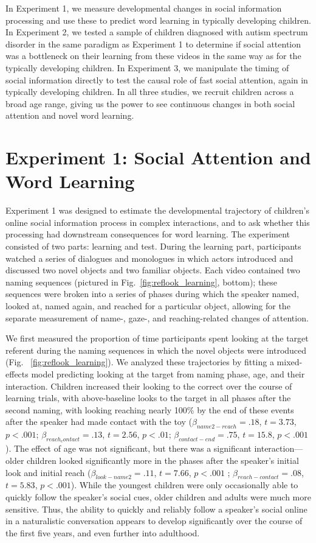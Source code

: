 \documentclass{pnastwo}
\begin{document}
\begin{article}
In Experiment 1, we measure developmental changes in social information processing and use these to predict word learning in typically developing children. In Experiment 2, we tested a sample of children diagnosed with autism spectrum disorder in the same paradigm as Experiment 1 to determine if social attention was a bottleneck on their learning from these videos in the same way as for the typically developing children. In Experiment 3, we manipulate the timing of social information directly to test the causal role of fast social attention, again in typically developing children. In all three studies, we recruit children across a broad age range, giving us the power to see continuous changes in both social attention and novel word learning. 

\section{Experiment 1: Social Attention and Word Learning}

Experiment 1 was designed to estimate the developmental trajectory of children's online social information process in complex interactions, and to ask whether this processing had downstream consequences for word learning. The experiment consisted of two parts: learning and test. During the learning part, participants watched a series of dialogues and monologues in which actors introduced and discussed two novel objects and two familiar objects. Each video contained two naming sequences (pictured in Fig.~\ref{fig:reflook_learning}, bottom); these sequences were broken into a series of phases during which the speaker named, looked at, named again, and reached for a particular object, allowing for the separate measurement of name-, gaze-, and reaching-related changes of attention. 

We first measured the proportion of time participants spent looking at the target referent during the naming sequences in which the novel objects were introduced (Fig. ~\ref{fig:reflook_learning}). We analyzed these trajectories by fitting a mixed-effects model predicting looking at the target from naming phase, age, and their interaction. Children increased their looking to the correct over the course of learning trials, with above-baseline looks to the target in all phases after the second naming, with looking reaching nearly 100\% by the end of these events after the speaker had made contact with the toy ($\beta_{name2-reach} = .18$, $t = 3.73$, $p < .001$; $\beta_{reach_contact} = .13$, $t = 2.56$, $p < .01$; $\beta_{contact-end} = .75$, $t = 15.8$, $p < .001$). The effect of age was not significant, but there was a significant interaction---older children looked significantly more in the phases after the speaker's initial look and initial reach ($\beta_{look-name2} = .11$, $t = 7.66$, $p < .001$ ; $\beta_{reach-contact} = .08$, $t = 5.83$, $p < .001$). While the youngest children were only occasionally able to quickly follow the speaker's social cues, older children and adults were much more sensitive. Thus, the ability to quickly and reliably follow a speaker's social  online in a naturalistic conversation appears to develop significantly over the course of the first five years, and even further into adulthood.


\end{article}
\end{document}
